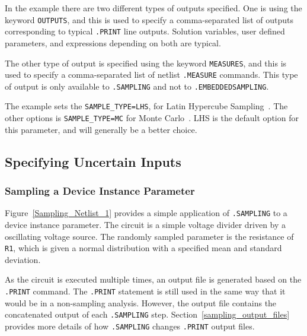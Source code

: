 In the example there are two different types of outputs specified.  One is using 
the keyword \texttt{OUTPUTS}, and this is used to specify a comma-separated list 
of outputs corresponding to typical \texttt{.PRINT} line outputs.  Solution 
variables, user defined parameters, and expressions depending on both are typical.  

The other type of output is specified using the keyword \texttt{MEASURES}, and 
this is used to specify a comma-separated list of netlist \texttt{.MEASURE} commands.
This type of output is only available to \texttt{.SAMPLING} and not to \texttt{.EMBEDDEDSAMPLING}.

The example sets the \texttt{SAMPLE\_TYPE=LHS}, for Latin Hypercube Sampling~\cite{HELTON200323}.  
The other options is \texttt{SAMPLE\_TYPE=MC} for Monte Carlo~\cite{Fishman1996}.  
LHS is the default option for this parameter, and will generally be a better choice.

\subsection{Specifying Uncertain Inputs}

\subsubsection{Sampling a Device Instance Parameter}
\label{sampling_InstanceParam}
Figure~\ref{Sampling_Netlist_1} provides a simple application of \verb|.SAMPLING| 
to a device instance parameter.  The circuit is a simple voltage divider driven 
by a oscillating voltage source.  The randomly sampled parameter is the resistance 
of \texttt{R1}, which is given a normal distribution with a specified mean and 
standard deviation.

As the circuit is executed multiple times, an output file is generated based on 
the \verb|.PRINT| command.  The \verb|.PRINT| statement is still used in the same 
way that it would be in a non-sampling analysis.  However, the output file 
contains the concatenated output of each \verb|.SAMPLING| step.  
Section~\ref{sampling_output_files} provides more details of how \texttt{.SAMPLING} 
changes \texttt{.PRINT} output files.


